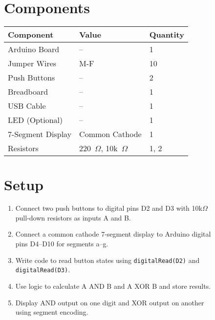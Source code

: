 \documentclass[12pt,a4paper]{article}
\begin{document}
\begin{figure}[H]
\begin{minipage}[t]{0.48\textwidth}
    \section*{Components}
    \small
    \renewcommand{\arraystretch}{1.3}
    \begin{tabular}{|l|l|l|}
      \hline
      \textbf{Component} & \textbf{Value} & \textbf{Quantity} \\ \hline
      Arduino Board & -- & 1 \\ \hline
      Jumper Wires & M-F & 10 \\ \hline
      Push Buttons & -- & 2 \\ \hline
      Breadboard & -- & 1 \\ \hline
      USB Cable & -- & 1 \\ \hline
      LED (Optional) & -- & 1 \\ \hline
      7-Segment Display & Common Cathode & 1 \\ \hline
      Resistors & 220~$\Omega$, 10k~$\Omega$ & 1, 2 \\ \hline
    \end{tabular}

    \vspace{0.8cm}
    \section*{Setup}
    \small
    \begin{enumerate}[left=0pt]
      \item Connect two push buttons to digital pins D2 and D3 with 10k$\Omega$ pull-down resistors as inputs A and B.
      \item Connect a common cathode 7-segment display to Arduino digital pins D4–D10 for segments a–g.
      \item Write code to read button states using \texttt{digitalRead(D2)} and \texttt{digitalRead(D3)}.
      \item Use logic to calculate A AND B and A XOR B and store results.
      \item Display AND output on one digit and XOR output on another using segment encoding.
    \end{enumerate}
  \end{minipage}
\end{figure}


\newpage
\end{document}
